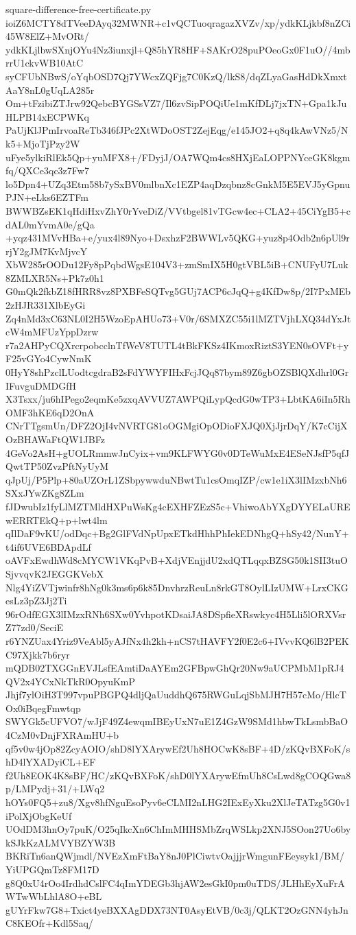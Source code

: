 \documentclass[11pt]{article}
\theoremstyle{definition}
\theoremstyle{remark}
\begin{document}
\begin{filecontents*}[overwrite]{square-difference-free-certificate.py}
ioiZ6MCTY8dTVeeDAyq32MWNR+c1vQCTuoqragazXVZv/xp/ydkKLjkbf8nZCi45W8ElZ+MvORt/
ydkKLjlbwSXnjOYu4Nz3iunxjl+Q85hYR8HF+SAKrO28puPOeoGx0F1uO//4mbrrU1ckvWB10AtC
syCFUbNBwS/oYqbOSD7Qj7YWcxZQFjg7C0KzQ/lkS8/dqZLyaGasHdDkXmxtAaY8nL0gUqLA285r
Om+tFzibiZTJrw92QebcBYGSsVZ7/Il6zvSipPOQiUe1mKfDLj7jxTN+Gpa1kJuHLPB14xECPWKq
PaUjKlJPmIrvoaReTb346fJPc2XtWDoOST2ZejEqg/e145JO2+q8q4kAwVNz5/Nk5+MjoTjPzy2W
uFye5ylkiRlEk5Qp+yuMFX8+/FDyjJ/OA7WQm4cs8HXjEaLOPPNYceGK8kgmfq/QXCe3qc3z7Fw7
lo5Dpn4+UZq3Etm58b7ySxBV0mlbnXc1EZP4aqDzqbnz8cGnkM5E5EVJ5yGpnuPJN+eLks6EZTFm
BWWBZsEK1qHdiHxvZhY0rYveDiZ/VVtbgel81vTGcw4ec+CLA2+45CiYgB5+cdAL0mYvmA0e/gQa
+yqz431MVvHBa+e/yux4l89Nyo+DsxhzF2BWWLv5QKG+yuz8p4Odb2n6pUl9rrjY2gJM7KvMjvcY
XbW285rOODu12Fy8pPqbdWgsE104V3+zmSmIX5H0gtVBL5iB+CNUFyU7Luk8ZMLXR5Ns+Pk7z0h1
G0mQk2fkbZ18fHRR8vz8PXBFeSQTvg5GUj7ACP6cJqQ+g4KfDw8p/2I7PxMEb2zHJR331XlbEyGi
Zq4nMd3xC63NL0I2H5WzoEpAHUo73+V0r/6SMXZC55i1lMZTVjhLXQ34dYxJtcW4mMFUzYppDzrw
r7a2AHPyCQXrcrpobcclnTfWeV8TUTL4tBkFKSz4IKmoxRiztS3YEN0sOVFt+yF25vGYo4CywNmK
0HyY8shPzclLUodtcgdraB2sFdYWYFIHxFcjJQq87bym89Z6gbOZSBlQXdhrl0GrIFuvguDMDGfH
X3Tsxx/ju6hIPego2eqmKe5zxqAVVUZ7AWPQiLypQcdG0wTP3+LbtKA6iIn5RhOMF3hKE6qD2OnA
CNrTTgsmUn/DFZ2OjI4vNVRTG81oOGMgiOpODioFXJQ0XjJjrDqY/K7cCijXOzBHAWaFtQW1JBFz
4GeVo2AsH+gUOLRmmwJnCyix+vm9KLFWYG0v0DTeWuMxE4ESeNJsfP5qfJQwtTP50ZvzPftNyUyM
qJpUj/P5Plp+80aUZOrL1ZSbpywwduNBwtTu1csOmqIZP/cw1e1iX3lIMzxbNh6SXxJYwZKg8ZLm
fJDwubIz1fyLlMZTMldHXPuWsKg4cEXHFZEzS5c+VhiwoAbYXgDYYELaUREwERRTEkQ+p+lwt4lm
qIlDaF9vKU/odDqc+Bg2GlFVdNpUpxETkdHhhPhIekEDNhgQ+hSy42/NunY+t4if6UVE6BDApdLf
oAVFxEwdhWd8cMYCW1VKqPvB+XdjVEnjjdU2xdQTLqqxBZSG50k1SII3tuOSjvvqvK2JEGGKVebX
Nlg4YiZVTjwinfr8hNg0k3ms6p6k85DnvhrzReuLn8rkGT8OylLIzUMW+LrxCKGesLz3pZ3Jj2Ti
96rOdfEGX3lIMzxRNh6SXw0YvhpotKDsaiJA8DSpfieXRswkyc4H5Lli5lORXVsrZ77zd0/SeciE
r6YNZUax4Yriz9VeAbl5yAJfNx4h2kh+nCS7tHAVFY2f0E2c6+IVvvKQ6lB2PEKC97Xjkk7b6ryr
mQDB02TXGGnEVJLsfEAmtiDaAYEm2GFBpwGhQr20Nw9aUCPMbM1pRJ4QV2x4YCxNkTkR0OpyuKmP
Jhjf7ylOiH3T997vpuPBGPQ4dljQaUuddhQ675RWGuLqjSbMJH7H57cMo/HlcTOx0iBqegFmwtqp
SWYGk5cUFVO7/wJjF49Z4ewqmIBEyUxN7uE1Z4GzW9SMd1hbwTkLsmbBaO4CzM0vDnjFXRAmHU+b
qf5v0w4jOp82ZcyAOIO/shD8lYXArywEf2Uh8HOCwK8sBF+4D/zKQvBXFoK/shD4lYXADyiCL+EF
f2Uh8EOK4K8sBF/HC/zKQvBXFoK/shD0lYXArywEfmUh8CsLwd8gCOQGwa8p/LMPydj+31/+LWq2
hOYs0FQ5+zu8/Xgv8hfNguEsoPyv6eCLMI2nLHG2IExEyXku2XlJeTATzg5G0v1iPolXjObgKeUf
UOdDM3hnOy7puK/O25qIkcXn6ChImMHHSMbZrqWSLkp2XNJ5SOon27Uo6bykSJkKzALMVYBZYW3B
BKRiTn6anQWjmdl/NVEzXmFtBaY8nJ0PlCiwtvOajjjrWmgunFEeysyk1/BM/YiUPGQmTz8FM17D
g8Q0xU4rOo4IrdhdCslFC4qImYDEGb3hjAW2esGkI0pm0uTDS/JLHhEyXuFrAWTwWbLhlA8O+eBL
gUYrFkw7G8+Txict4yeBXXAgDDX73NT0AsyEtVB/0c3j/QLKT2OzGNN4yhJnC8KEOfr+Kdl5Saq/

\end{filecontents*}
\end{document}

